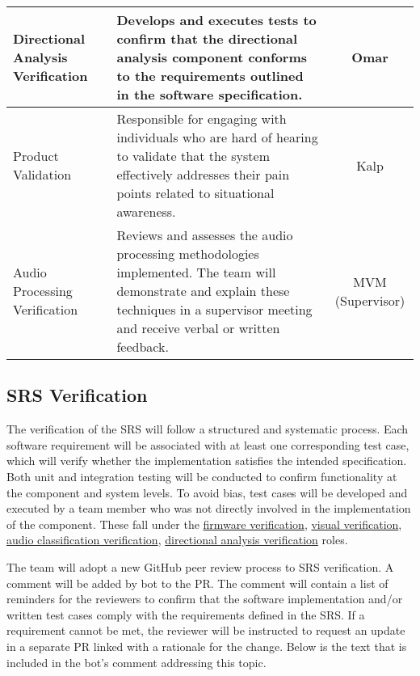 \documentclass[12pt, titlepage]{article}
\begin{document}
\begin{xltabular}{\textwidth}{|X|X|c|}
  Directional Analysis Verification \label{role:directional_verfication}&
  Develops and executes tests to confirm that the directional analysis
  component conforms to the requirements outlined in the software
  specification. &
  Omar \\
  \hline

  Product Validation \label{role:product_validation} &
  Responsible for engaging with individuals who are hard of hearing to
  validate that the system effectively addresses their pain points related to
  situational awareness. &
  Kalp \\
  \hline

  Audio Processing Verification \label{role:audio_processing_verification}  &
  Reviews and assesses the audio processing methodologies implemented. The
  team will demonstrate and explain these techniques in a supervisor meeting
  and receive verbal or written feedback. &
  MVM (Supervisor) \\

\end{xltabular}

\subsection{SRS Verification}\label{sec:srs_verification}

The verification of the SRS will follow a structured and systematic process.
Each software requirement will be associated with at least one corresponding
test case, which will verify whether the
implementation satisfies the intended specification. Both unit and integration
testing will be conducted to confirm functionality at the component and system
levels. To avoid bias, test cases will be developed and executed by a team
member who was not directly involved in the implementation of the component.
These fall under the
\hyperref[role:firmware_verfication]{firmware verification},
\hyperref[role:visual_vnv]{visual verification},
\hyperref[role:classification_verfication]{audio classification verification},
\hyperref[role:directional_verfication]{directional analysis verification}
roles. \newline

The team will adopt a new GitHub peer review process to SRS verification. A 
comment will be added by bot to the PR. The comment will contain a list of
reminders for the reviewers to confirm that the
software implementation and/or written test cases comply with the requirements
defined in the SRS. If a requirement cannot be met, the reviewer will be
instructed to request an update in a separate PR linked with a rationale for the
change. Below is the text that is included in the bot's comment addressing this
topic. \newline
\end{document}
